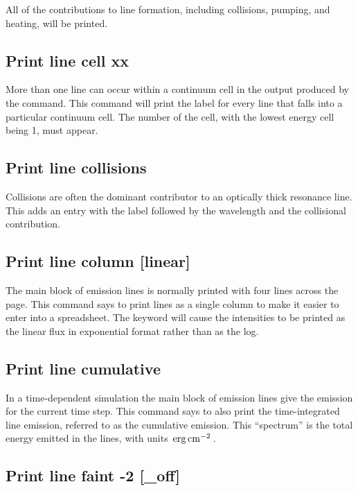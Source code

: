 All of the contributions to line formation, including collisions, pumping,
and heating, will be printed.

\subsection{Print line cell xx}

More than one line can occur within a continuum cell in the output
produced by the  command.
This command will print the label for every line that falls into a particular
continuum cell.
The number of the cell, with the lowest energy cell being 1,
must appear.

\subsection{Print line collisions}

Collisions are often the dominant contributor to an optically thick
resonance line.
This adds an entry with the label 
followed by the wavelength and the collisional contribution.

\subsection{Print line column [linear]}

The main block of emission lines is normally printed with four lines
across the page.
This command says to print lines as a single column to
make it easier to enter into a spreadsheet.
The keyword  will cause
the intensities to be printed as the linear flux in exponential format rather than as the log.

\subsection{Print line cumulative}
\label{sec:CommandPrintLineCumulative}

In a time-dependent simulation the main block of emission
lines give the emission for the current time step.
This command says to also print the time-integrated line emission,
referred to as the cumulative emission.
This ``spectrum'' is the total energy emitted in the lines,
with units $\mbox{${\rm\thinspace erg}{\rm\thinspace cm}^{-2}\,$}$.

\subsection{Print line faint -2 [\_off]}

